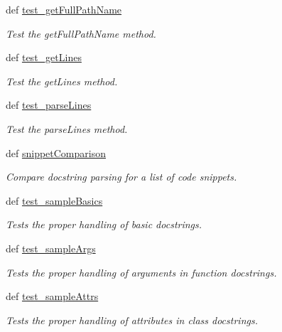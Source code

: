 \begin{DoxyCompactItemize}
def \hyperlink{classdoxypypy_1_1test_1_1test__doxypypy_1_1_test_doxypypy_a0fcfae02ae9a67841aa299943fdb292b}{test\-\_\-get\-Full\-Path\-Name}
\begin{DoxyCompactList}\small\item\em Test the get\-Full\-Path\-Name method. \end{DoxyCompactList}\item 
def \hyperlink{classdoxypypy_1_1test_1_1test__doxypypy_1_1_test_doxypypy_a5551a101dca8f5fc7f2976fc0162e91b}{test\-\_\-get\-Lines}
\begin{DoxyCompactList}\small\item\em Test the get\-Lines method. \end{DoxyCompactList}\item 
def \hyperlink{classdoxypypy_1_1test_1_1test__doxypypy_1_1_test_doxypypy_a8a6c6b6d8201ec6a2bccaa83a9a531cc}{test\-\_\-parse\-Lines}
\begin{DoxyCompactList}\small\item\em Test the parse\-Lines method. \end{DoxyCompactList}\item 
def \hyperlink{classdoxypypy_1_1test_1_1test__doxypypy_1_1_test_doxypypy_a8c70204e2bffcc71c2e80c0af4f7fc29}{snippet\-Comparison}
\begin{DoxyCompactList}\small\item\em Compare docstring parsing for a list of code snippets. \end{DoxyCompactList}\item 
def \hyperlink{classdoxypypy_1_1test_1_1test__doxypypy_1_1_test_doxypypy_a2f4c761682884da9999f16fc7585cabb}{test\-\_\-sample\-Basics}
\begin{DoxyCompactList}\small\item\em Tests the proper handling of basic docstrings. \end{DoxyCompactList}\item 
def \hyperlink{classdoxypypy_1_1test_1_1test__doxypypy_1_1_test_doxypypy_a76f2de98e11af10b34172384604c0548}{test\-\_\-sample\-Args}
\begin{DoxyCompactList}\small\item\em Tests the proper handling of arguments in function docstrings. \end{DoxyCompactList}\item 
def \hyperlink{classdoxypypy_1_1test_1_1test__doxypypy_1_1_test_doxypypy_a606f55c24a614673d39c5b48cd55e73c}{test\-\_\-sample\-Attrs}
\begin{DoxyCompactList}\small\item\em Tests the proper handling of attributes in class docstrings. \end{DoxyCompactList}\item 

\end{DoxyCompactItemize}

